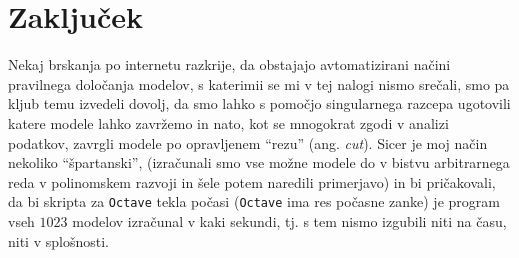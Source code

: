 \documentclass[a4 paper, 12pt]{article}
\begin{document}
\section{Zaklju\v cek}

Nekaj brskanja po internetu razkrije, da obstajajo avtomatizirani na\v cini pravilnega dolo\v canja modelov, s katerimii
se mi v tej nalogi nismo sre\v cali, smo pa kljub temu izvedeli dovolj, da smo lahko s pomo\v cjo singularnega razcepa
ugotovili katere modele lahko zavr\v zemo in nato, kot se mnogokrat zgodi v analizi podatkov, zavrgli modele po opravljenem
"`rezu"' (ang. \emph{cut}). Sicer je moj na\v cin nekoliko "`\v spartanski"', (izra\v cunali smo vse mo\v zne modele do
v bistvu arbitrarnega reda v polinomskem razvoji in \v sele potem naredili primerjavo) in bi pri\v cakovali, da bi 
skripta za {\tt Octave} tekla po\v casi ({\tt Octave} ima res po\v casne zanke) je program vseh $1023$ modelov izra\v cunal
v kaki sekundi, tj. s tem nismo izgubili niti na \v casu, niti v splo\v snosti.
\end{document}
